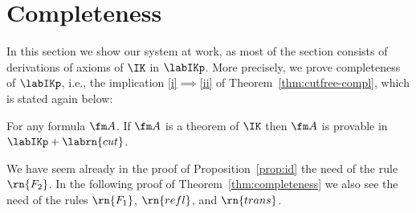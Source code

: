 
\section{Completeness}\label{sec:completeness}

In this section we show our system at work, as most of the section
consists of derivations of axioms of $\IK$ in $\labIKp$. More precisely, we prove completeness of $\labIKp$, i.e., the implication \ref{i}$\implies$\ref{ii} of Theorem~\ref{thm:cutfree-compl}, which is stated again below:

\begin{theorem}\label{thm:completeness}
	For any formula $\fm A$. If $\fm A$ is a theorem of $\IK$ then $\fm A$ is provable in $\labIKp +\labrn{cut}$.
\end{theorem}

\begin{remark}
  We have seem already in the proof of Proposition~\ref{prop:id} the
  need of the rule $\rn{F_2}$. In the following proof of
  Theorem~\ref{thm:completeness} we also see the need of the rules
  $\rn{F_1}$, $\rn{refl}$, and $\rn{trans}$.
\end{remark}

